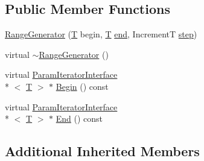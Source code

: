 \subsection*{Public Member Functions}
\begin{DoxyCompactItemize}
\item 
\hyperlink{classtesting_1_1internal_1_1RangeGenerator_a5b3b83223b9cada3569bcee729e0fdf3}{Range\-Generator} (\hyperlink{calib3d_8hpp_a3efb9551a871ddd0463079a808916717}{T} begin, \hyperlink{calib3d_8hpp_a3efb9551a871ddd0463079a808916717}{T} \hyperlink{legacy_8hpp_ab21668ff869102944cbf3bb534bba27d}{end}, Increment\-T \hyperlink{legacy_8hpp_abc16e65f240ed0c8f3e876e8732c0a33}{step})
\item 
virtual \hyperlink{classtesting_1_1internal_1_1RangeGenerator_a680b80b06f471b5f93d8433609017021}{$\sim$\-Range\-Generator} ()
\item 
virtual \hyperlink{classtesting_1_1internal_1_1ParamIteratorInterface}{Param\-Iterator\-Interface}\\*
$<$ \hyperlink{calib3d_8hpp_a3efb9551a871ddd0463079a808916717}{T} $>$ $\ast$ \hyperlink{classtesting_1_1internal_1_1RangeGenerator_a9e70968c0a928b5f8b5e157ef823d504}{Begin} () const 
\item 
virtual \hyperlink{classtesting_1_1internal_1_1ParamIteratorInterface}{Param\-Iterator\-Interface}\\*
$<$ \hyperlink{calib3d_8hpp_a3efb9551a871ddd0463079a808916717}{T} $>$ $\ast$ \hyperlink{classtesting_1_1internal_1_1RangeGenerator_a9af92f542fa637b38b82ab240d2d426e}{End} () const 
\end{DoxyCompactItemize}
\subsection*{Additional Inherited Members}


